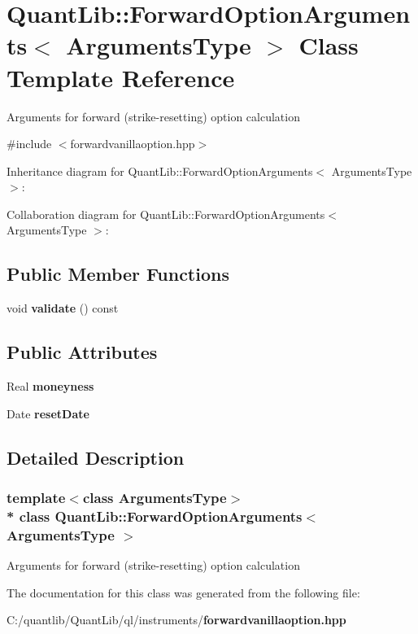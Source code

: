 \section{Quant\+Lib\+:\+:Forward\+Option\+Arguments$<$ Arguments\+Type $>$ Class Template Reference}
\label{class_quant_lib_1_1_forward_option_arguments}


Arguments for forward (strike-\/resetting) option calculation  




{\ttfamily \#include $<$forwardvanillaoption.\+hpp$>$}



Inheritance diagram for Quant\+Lib\+:\+:Forward\+Option\+Arguments$<$ Arguments\+Type $>$\+:


Collaboration diagram for Quant\+Lib\+:\+:Forward\+Option\+Arguments$<$ Arguments\+Type $>$\+:
\subsection*{Public Member Functions}
\begin{DoxyCompactItemize}
\item 
void {\bfseries validate} () const \label{class_quant_lib_1_1_forward_option_arguments_ad44ef8ed4e692cc1e3437927f9546709}

\end{DoxyCompactItemize}
\subsection*{Public Attributes}
\begin{DoxyCompactItemize}
\item 
Real {\bfseries moneyness}\label{class_quant_lib_1_1_forward_option_arguments_a1bc2b8458ff5f8992a98ded1cf171783}

\item 
Date {\bfseries reset\+Date}\label{class_quant_lib_1_1_forward_option_arguments_a25c5541da3d584f6517fc22e548d04bc}

\end{DoxyCompactItemize}


\subsection{Detailed Description}
\subsubsection*{template$<$class Arguments\+Type$>$\\*
class Quant\+Lib\+::\+Forward\+Option\+Arguments$<$ Arguments\+Type $>$}

Arguments for forward (strike-\/resetting) option calculation 

The documentation for this class was generated from the following file\+:\begin{DoxyCompactItemize}
\item 
C\+:/quantlib/\+Quant\+Lib/ql/instruments/{\bf forwardvanillaoption.\+hpp}\end{DoxyCompactItemize}
